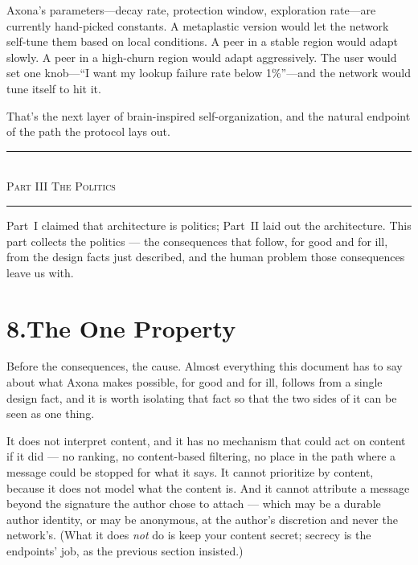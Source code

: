 \documentclass[nobib,justified]{tufte-handout}
\newcommand{\manpart}[1]{%
  \needspace{8\baselineskip}%
  \begin{center}%
  \vspace{1.2em}%
  {\color{rust}\rule{3em}{0.8pt}}\\[0.7em]%
  {\scshape\large #1}\\[0.4em]%
  {\color{rust}\rule{3em}{0.8pt}}%
  \vspace{0.9em}%
  \end{center}}
\begin{document}
Axona's parameters---decay rate, protection window, exploration rate---are currently hand-picked constants. A metaplastic version would let the network self-tune them based on local conditions. A peer in a stable region would adapt slowly. A peer in a high-churn region would adapt aggressively. The user would set one knob---``I want my lookup failure rate below 1\%''---and the network would tune itself to hit it.

That's the next layer of brain-inspired self-organization, and the natural endpoint of the path the protocol lays out.



\newpage
\manpart{Part III \;\textbullet\; The Politics}

Part~I claimed that architecture is politics; Part~II laid out the architecture. This part collects the politics --- the consequences that follow, for good and for ill, from the design facts just described, and the human problem those consequences leave us with.

\section{8.\quad The One Property}

Before the consequences, the cause. Almost everything this document has to say
about what Axona makes possible, for good and for ill, follows from a single
design fact, and it is worth isolating that fact so that the two sides of it can
be seen as one thing.

 It does not interpret content, and it has no
mechanism that could act on content if it did --- no ranking, no content-based
filtering, no place in the path where a message could be stopped for what it
says. It cannot prioritize by content, because it does not model what the
content is. And it cannot attribute a message beyond the signature the author
chose to attach --- which may be a durable author identity, or may be anonymous,
at the author's discretion and never the network's. (What it does \emph{not} do
is keep your content secret; secrecy is the endpoints' job, as the previous
section insisted.)
\end{document}
